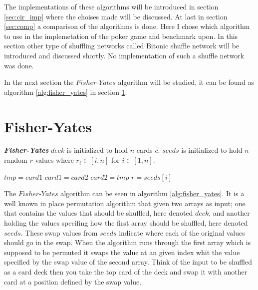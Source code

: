 \documentclass[twoside,11pt,openright]{report}
\begin{document}
The implementations of these algorithms will be introduced in section \ref{sec:cir_imp} where the choises made will be discussed. At last in section \ref{sec:comp} a comparison of the algorithms is done. Here I chose which algorithm to use in the implemetation of the poker game and benchmark upon. In this section other type of shuffling networks called Bitonic shuffle network will be introduced and discussed shortly. No implementation of such a shuffle network was done.

\bigskip

In the next section the $Fisher\text{-}Yates$ algorithm will be studied, it can be found as algorithm \ref{alg:fisher_yates} in section \ref{sec:fisher-yates}.

\section{Fisher-Yates}
\label{sec:fisher-yates}

\begin{algorithm}
\caption{\textbf{\textit{Fisher-Yates}} \newline
    $deck$ is initialized to hold $n$ cards $c$. \newline
    $seeds$ is initialized to hold $n$ random $r$ values where $r_i\in[i,n]$ for $i\in [1,n]$.
}
\label{alg:fisher_yates}

\begin{algorithmic}[1]
\State $tmp = card1$
\State $card1 = card2$
\State $card2 = tmp$
\EndFunction
\State
{}
\State $r = seeds[i]$
\State {}
\EndFor
\EndFunction
\end{algorithmic}
\end{algorithm}

The $Fisher\text{-}Yates$ algorithm can be seen in algorithm \ref{alg:fisher_yates}. It is a well known in place permutation algorithm that given two arrays as input; one that contains the values that should be shuffled, here denoted $deck$, and another holding the values specifing how the first array should be shuffled, here denoted $seeds$. These swap values from $seeds$ indicate where each of the original values should go in the swap. When the algorithm runs through the first array which is supposed to be permuted it swaps the value at an given index whit the value specified by the swap value of the second array. Think of the input to be shuffled as a card deck then you take the top card of the deck and swap it with another card at a position defined by the swap value.
\end{document}
